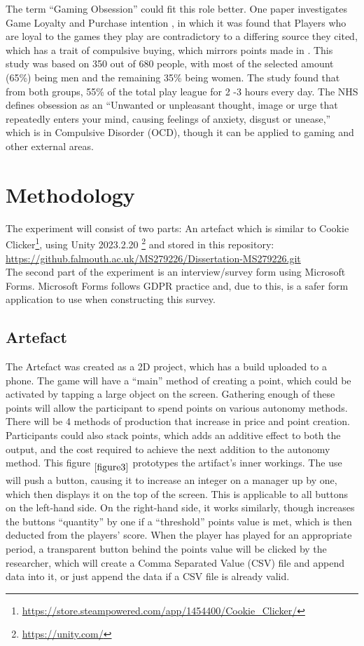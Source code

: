 \documentclass[conference]{IEEEtran}
\begin{document}
The term “Gaming Obsession” could fit this role better. One paper investigates Game Loyalty and Purchase intention \cite{Ramli2022}, in which it was found that Players who are loyal to the games they play are contradictory to a differing source they cited\cite{Widodo2020}, which has a trait of compulsive buying, which mirrors points made in \cite{yasir2021}. This study was based on 350 out of 680 people, with most of the selected amount (65\%) being men and the remaining 35\% being women. The study found that from both groups, 55\% of the total play league for 2 -3 hours every day. The NHS \cite{NHS2021} defines obsession as an “Unwanted or unpleasant thought, image or urge that repeatedly enters your mind, causing feelings of anxiety, disgust or unease,” which is in Compulsive Disorder (OCD), though it can be applied to gaming and other external areas.\\

\section{Methodology}
 The experiment will consist of two parts: An artefact which is similar to Cookie Clicker\footnote{\url{https://store.steampowered.com/app/1454400/Cookie_Clicker/}}, using Unity 2023.2.20  \footnote{\url{https://unity.com/}} and stored in this repository:\\

\url{https://github.falmouth.ac.uk/MS279226/Dissertation-MS279226.git}\\

The second part of the experiment is an interview/survey form using Microsoft Forms. Microsoft Forms follows GDPR practice and, due to this, is a safer form application to use when constructing this survey.

\subsection{Artefact}
The Artefact was created as a 2D project, which has a build uploaded to a phone. The game will have a “main” method of creating a point, which could be activated by tapping a large object on the screen. Gathering enough of these points will allow the participant to spend points on various autonomy methods. There will be 4 methods of production that increase in price and point creation. Participants could also stack points, which adds an additive effect to both the output, and the cost required to achieve the next addition to the autonomy method. This figure $_{\ref{figure3}}$ prototypes the artifact’s inner workings. The use will push a button, causing it to increase an integer on a manager up by one, which then displays it on the top of the screen. This is applicable to all buttons on the left-hand side. On the right-hand side, it works similarly, though increases the buttons “quantity” by one if a “threshold” points value is met, which is then deducted from the players’ score. When the player has played for an appropriate period, a transparent button behind the points value will be clicked by the researcher, which will create a Comma Separated Value (CSV) file and append data into it, or just append the data if a CSV file is already valid.\\
\end{document}
